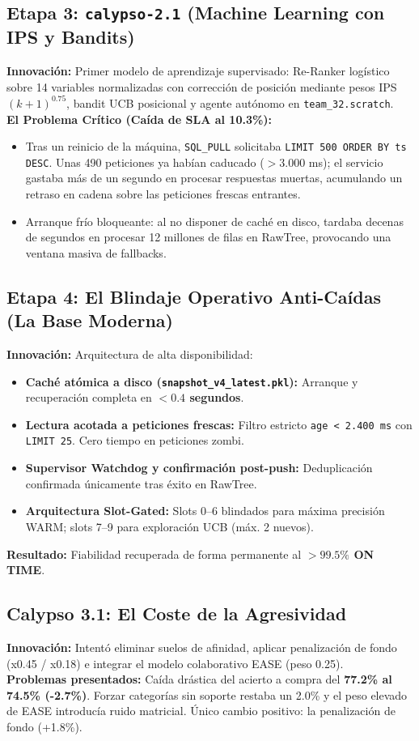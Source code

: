 \documentclass[11pt,a4paper]{article}
\begin{document}
\subsection{Etapa 3: \texttt{calypso-2.1} (Machine Learning con IPS y Bandits)}
\textbf{Innovación:} Primer modelo de aprendizaje supervisado: Re-Ranker logístico sobre 14 variables normalizadas con corrección de posición mediante pesos IPS $(k+1)^{0.75}$, bandit UCB posicional y agente autónomo en \texttt{team\_32.scratch}.\\
\textbf{El Problema Crítico (Caída de SLA al 10.3\%):}
\begin{itemize}[noitemsep]
    \item Tras un reinicio de la máquina, \texttt{SQL\_PULL} solicitaba \texttt{LIMIT 500 ORDER BY ts DESC}. Unas 490 peticiones ya habían caducado ($>3.000$ ms); el servicio gastaba más de un segundo en procesar respuestas muertas, acumulando un retraso en cadena sobre las peticiones frescas entrantes.
    \item Arranque frío bloqueante: al no disponer de caché en disco, tardaba decenas de segundos en procesar 12 millones de filas en RawTree, provocando una ventana masiva de fallbacks.
\end{itemize}

\subsection{Etapa 4: El Blindaje Operativo Anti-Caídas (La Base Moderna)}
\textbf{Innovación:} Arquitectura de alta disponibilidad:
\begin{itemize}[noitemsep]
    \item \textbf{Caché atómica a disco (\texttt{snapshot\_v4\_latest.pkl}):} Arranque y recuperación completa en \textbf{$< 0.4$ segundos}.
    \item \textbf{Lectura acotada a peticiones frescas:} Filtro estricto \texttt{age < 2.400 ms} con \texttt{LIMIT 25}. Cero tiempo en peticiones zombi.
    \item \textbf{Supervisor Watchdog y confirmación post-push:} Deduplicación confirmada únicamente tras éxito en RawTree.
    \item \textbf{Arquitectura Slot-Gated:} Slots 0--6 blindados para máxima precisión WARM; slots 7--9 para exploración UCB (máx. 2 nuevos).
\end{itemize}
\textbf{Resultado:} Fiabilidad recuperada de forma permanente al \textbf{$>99.5\%$ ON TIME}.

\subsection{Calypso 3.1: El Coste de la Agresividad}
\textbf{Innovación:} Intentó eliminar suelos de afinidad, aplicar penalización de fondo (x0.45 / x0.18) e integrar el modelo colaborativo EASE (peso 0.25).\\
\textbf{Problemas presentados:} Caída drástica del acierto a compra del \textbf{77.2\% al 74.5\% (-2.7\%)}. Forzar categorías sin soporte restaba un 2.0\% y el peso elevado de EASE introducía ruido matricial. Único cambio positivo: la penalización de fondo (+1.8\%).
\end{document}
